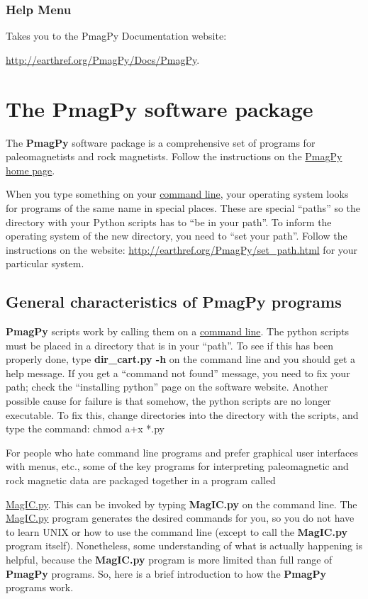 \documentclass[11pt]{book}
\begin{document}
{\subsection{Help Menu}

Takes you to the PmagPy Documentation website:

 \url{http://earthref.org/PmagPy/Docs/PmagPy}.  

\chapter{The {\bf PmagPy} software package}
\label{chap:PmagPy}



The {\bf PmagPy} software package is a comprehensive set of programs for paleomagnetists and rock magnetists.  Follow the instructions on the \href{http://earthref.org/PmagPy}{PmagPy home page}. 

When you type something on your \href{#command_line}{command line}, your operating system looks for programs of the same name in special places.  These are special ``paths'' so the directory with your Python scripts has to ``be in your path''.  To inform the operating system of the new directory, you need to ``set your path''.    Follow the instructions on the website:
\url{http://earthref.org/PmagPy/set_path.html} for your particular system.  


 
 \section{General characteristics of PmagPy programs}
 
{\bf PmagPy}  scripts work by calling them on a \href{#command_line}{command line}.  
 The python scripts must be placed in a directory that is in your ``path''.  To see if this has been properly done, type {\bf dir\_cart.py -h} on the command line and you should get a help message.  If you get a ``command not found'' message, you need to fix your path; check the ``installing python'' page on the software website.   Another possible cause for failure is that somehow, the python scripts are no longer executable.  To fix this, change directories into the directory with the scripts, and type the command:  chmod a+x *.py  

For people who hate command line programs and prefer graphical user interfaces with menus, etc., some of the key programs for interpreting paleomagnetic and rock magnetic data are packaged together in a program called {\href{#MagIC.py}{MagIC.py}.  This can be invoked by typing {\bf MagIC.py} on the command line.  
The \href{#MagIC.py}{MagIC.py} program generates the desired commands for you, so you do not have to learn UNIX or how to use the command line (except to call the {\bf MagIC.py} program itself).  Nonetheless, some understanding of what is actually happening is helpful, because the {\bf MagIC.py} program is more limited than  full range of {\bf PmagPy} programs.  So, here is a brief introduction to how the {\bf PmagPy} programs work.

}}
\end{document}
